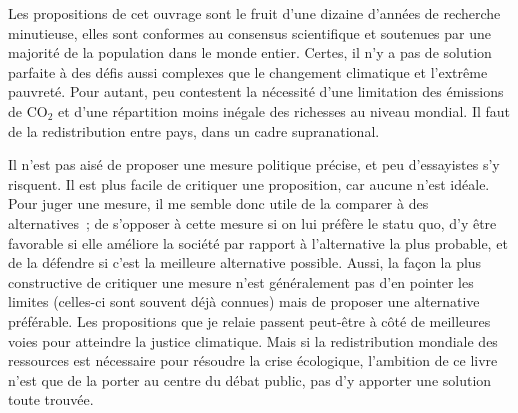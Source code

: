\documentclass[a5paper,french,openany]{memoir}
\begin{document}
Les propositions de cet ouvrage sont le fruit d'une dizaine d'années de recherche minutieuse, elles sont conformes au consensus scientifique et soutenues par une majorité de la population dans le monde entier. 
Certes, il n'y a pas de solution parfaite à des défis aussi complexes que le changement climatique et l'extrême pauvreté. 
Pour autant, peu contestent la nécessité d'une limitation des émissions de CO$_\text{2}$ et  %
d'une répartition moins inégale des richesses au niveau mondial. Il faut de la redistribution entre pays, dans un cadre supranational. 

Il n'est pas aisé de proposer une mesure politique précise, et peu d'essayistes s'y risquent. Il est plus facile de critiquer une proposition, car aucune n'est idéale. Pour juger une mesure, il me semble donc utile de la comparer à des alternatives~; de s'opposer à cette mesure si on lui préfère le statu quo, d'y être favorable si elle améliore la société par rapport à l'alternative la plus probable, et de la défendre si c'est la meilleure alternative possible. Aussi, la façon la plus constructive de critiquer une mesure n'est généralement pas d'en pointer les limites (celles-ci sont souvent déjà connues) mais de proposer une alternative préférable. 
Les propositions que je relaie %
passent peut-être 
à côté de meilleures voies pour atteindre la justice climatique. %
Mais si la redistribution mondiale des ressources est nécessaire pour résoudre la crise écologique, l'ambition de ce livre n'est que de la porter au centre du débat public, %
pas d'y apporter une solution toute trouvée. 
\end{document}
